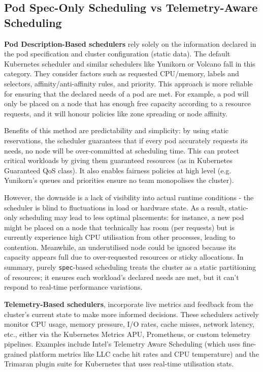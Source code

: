 \subsection{Pod Spec-Only Scheduling vs Telemetry-Aware Scheduling}

\textbf{Pod Description-Based schedulers} rely solely on the information declared
in the pod specification and cluster configuration (static data). The default
Kubernetes scheduler \cite{} and similar schedulers like Yunikorn or Volcano
\cite{} fall in this category. They consider factors such as requested
CPU/memory, labels and selectors, affinity/anti-affinity rules, and priority.
This approach is more reliable for ensuring that the declared needs of a pod are
met. For example, a pod will only be placed on a node that has enough free
capacity according to a resource requests, and it will honour policies like zone
spreading or node affinity.

Benefits of this method are predictability and
simplicity: by using static reservations, the scheduler guarantees that if every
pod accurately requests its needs, no node will be over-committed at scheduling
time. This can protect critical workloads by giving them guaranteed resources
(as in Kubernetes Guaranteed QoS class). It also enables fairness policies at
high level (e.g. Yunikorn's queues and priorities ensure no team monopolises the
cluster).

However, the downside is a lack of visibility into actual runtime conditions -
the scheduler is blind to fluctuations in load or hardware state. As a result,
static-only scheduling may lead to less optimal placements: for instance, a new
pod might be placed on a node that technically has room (per requests) but is
currently experience high CPU utilisation from other processes, leading to
contention. Meanwhile, an underutilised node could be ignored because its
capacity appears full due to over-requested resources or sticky allocations. In
summary, purely \verb|spec|-based scheduling treats the cluster as a static
partitioning of resources; it ensures each workload's declared needs are met, but
it can't respond to real-time performance variations.

\textbf{Telemetry-Based schedulers}, incorporate live metrics and feedback from
the cluster's current state to make more informed decisions. These schedulers
actively monitor CPU usage, memory pressure, I/O rates, cache misses, network
latency, etc., either via the Kubernetes Metrics APU, Prometheus, or custom
telemetry pipelines. Examples include Intel's Telemetry Aware Scheduling \cite{}
(which uses fine-grained platform metrics like LLC cache hit rates and CPU
temperature) and the Trimaran plugin suite for Kubernetes \cite{} that uses
real-time utilisation stats.

